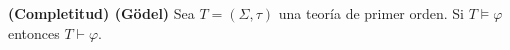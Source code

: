   \begin{theorem}
    \PN \textbf{(Completitud) (G{\"o}del)} Sea $T = (\Sigma, \tau)$ una teoría de primer orden. Si $T \models \varphi$
    entonces $T \vdash \varphi$.
  \end{theorem}
